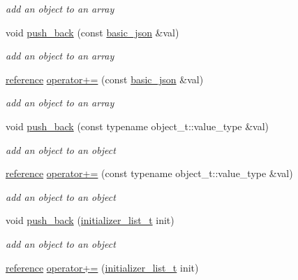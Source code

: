 \begin{DoxyCompactItemize}
\begin{DoxyCompactList}\small\item\em add an object to an array \end{DoxyCompactList}\item 
void \hyperlink{classnlohmann_1_1basic__json_a3405d38087e13994a5a4556065b0be6d}{push\+\_\+back} (const \hyperlink{classnlohmann_1_1basic__json}{basic\+\_\+json} \&val)
\begin{DoxyCompactList}\small\item\em add an object to an array \end{DoxyCompactList}\item 
\hyperlink{classnlohmann_1_1basic__json_a220ae98554a76205fb7f8822d36b2d5a}{reference} \hyperlink{classnlohmann_1_1basic__json_af643a4baa91f484b11af0e4437183115}{operator+=} (const \hyperlink{classnlohmann_1_1basic__json}{basic\+\_\+json} \&val)
\begin{DoxyCompactList}\small\item\em add an object to an array \end{DoxyCompactList}\item 
void \hyperlink{classnlohmann_1_1basic__json_ad704839e6a5195e3b76f22e2b9aa63ee}{push\+\_\+back} (const typename object\+\_\+t\+::value\+\_\+type \&val)
\begin{DoxyCompactList}\small\item\em add an object to an object \end{DoxyCompactList}\item 
\hyperlink{classnlohmann_1_1basic__json_a220ae98554a76205fb7f8822d36b2d5a}{reference} \hyperlink{classnlohmann_1_1basic__json_ae300819781bce2193369609457f70f30}{operator+=} (const typename object\+\_\+t\+::value\+\_\+type \&val)
\begin{DoxyCompactList}\small\item\em add an object to an object \end{DoxyCompactList}\item 
void \hyperlink{classnlohmann_1_1basic__json_a4567cf75f19b1efca090f75d7a8a350a}{push\+\_\+back} (\hyperlink{classnlohmann_1_1basic__json_ac569f292a070dfd2f6b69c16e746095a}{initializer\+\_\+list\+\_\+t} init)
\begin{DoxyCompactList}\small\item\em add an object to an object \end{DoxyCompactList}\item 
\hyperlink{classnlohmann_1_1basic__json_a220ae98554a76205fb7f8822d36b2d5a}{reference} \hyperlink{classnlohmann_1_1basic__json_ac48302a8b4f8c2a6e30c2a7bff6abc49}{operator+=} (\hyperlink{classnlohmann_1_1basic__json_ac569f292a070dfd2f6b69c16e746095a}{initializer\+\_\+list\+\_\+t} init)

\end{DoxyCompactItemize}
